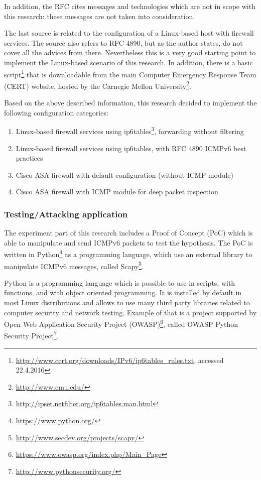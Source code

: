 \documentclass[12pt]{article}
\begin{document}
In addition, the RFC cites messages and technologies which are not in scope with this research: these messages are not taken into consideration.

The last source is related to the configuration of a Linux-based host with firewall services. The source also refers to RFC 4890, but as the author states, do not cover all the advices from there. Nevertheless this is a very good starting point to implement the Linux-based scenario of this research\cite{ip6tablesGiobbi}. In addition, there is a basic script\footnote{\url{http://www.cert.org/downloads/IPv6/ip6tables_rules.txt}, accessed 22.4.2016} that is downloadable from the main Computer Emergency Response Team (CERT) website, hosted by the Carnegie Mellon University\footnote{\url{http://www.cmu.edu/}}. 

Based on the above described information, this research decided to implement the following configuration categories:
\vspace{-10pt}
\begin{enumerate}[noitemsep,topsep=0pt,partopsep=0pt]
 \label{confCategories}
 \item Linux-based firewall services using ip6tables\footnote{\url{http://ipset.netfilter.org/ip6tables.man.html}}, forwarding without filtering
 \item Linux-based firewall services using ip6tables, with RFC 4890 ICMPv6 best practices
 \item Cisco ASA firewall with default configuration (without ICMP module)
 \item Cisco ASA firewall with ICMP module for deep packet inspection
\end{enumerate}


\subsubsection{Testing/Attacking application}
\label{subsub:framework}

The experiment part of this research includes a Proof of Concept (PoC) which is able to manipulate and send ICMPv6 packets to test the hypothesis. The PoC is written in Python\footnote{\url{https://www.python.org/}} as a programming language, which use an external library to manipulate ICMPv6 messages, called Scapy\footnote{\url{http://www.secdev.org/projects/scapy/}}.

Python is a programming language which is possible to use in scripts, with functions, and with object oriented programming. It is installed by default in most Linux distributions and allows to use many third party libraries related to computer security and network testing. Example of that is a project supported by Open Web Application Security Project (OWASP)\footnote{\url{https://www.owasp.org/index.php/Main_Page}}, called OWASP Python Security Project\footnote{\url{http://www.pythonsecurity.org/}}.
\end{document}
